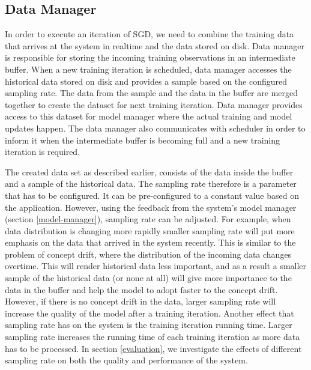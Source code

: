 \documentclass{sig-alternate-05-2015}
\begin{document}

\subsection{Data Manager} \label{data-manager}
In order to execute an iteration of SGD, we need to combine the training data that arrives at the system in realtime and the data stored on disk.
Data manager is responsible for storing the incoming training observations in an intermediate buffer.
When a new training iteration is scheduled, data manager accesses the historical data stored on disk and provides a sample based on the configured sampling rate.
The data from the sample and the data in the buffer are merged together to create the dataset for next training iteration.
Data manager provides access to this dataset for model manager where the actual training and model updates happen.
The data manager also communicates with scheduler in order to inform it when the intermediate buffer is becoming full and a new training iteration is required. 

The created data set as described earlier, consists of the data inside the buffer and a sample of the historical data.
The sampling rate therefore is a parameter that has to be configured.
It can be pre-configured to a constant value based on the application.
However, using the feedback from the system's model manager (section \ref{model-manager}), sampling rate can be adjusted.
For example, when data distribution is changing more rapidly smaller sampling rate will put more emphasis on the data that arrived in the system recently. 
This is similar to the problem of concept drift, where the distribution of the incoming data changes overtime.
This will render historical data less important, and as a result a smaller sample of the historical data (or none at all) will give more importance to the data in the buffer and help the model to adopt faster to the concept drift.
However, if there is no concept drift in the data, larger sampling rate will increase the quality of the model after a training iteration.
Another effect that sampling rate has on the system is the training iteration running time.
Larger sampling rate increases the running time of each training iteration as more data has to be processed.
In section \ref{evaluation}, we investigate the effects of different sampling rate on both the quality and performance of the system.
\end{document}
